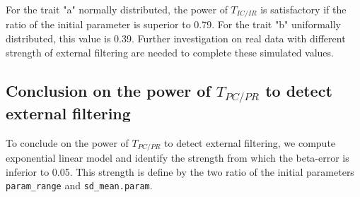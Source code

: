 \documentclass[12pt]{article}\usepackage[]{graphicx}\usepackage[]{color}
\begin{document}
For the trait "a" normally distributed, the power of $T_{IC/IR}$ is satisfactory if the ratio of the initial parameter is superior to
 0.79. For the trait "b" uniformally distributed, this value is 0.39. 
 Further investigation on real data with different strength of external filtering are needed to complete these simulated values.

 




  \subsection {Conclusion on the power of $T_{PC/PR}$ to detect external filtering}

To conclude on the power of $T_{PC/PR}$ to detect external filtering, we compute exponential linear model and identify the strength from which the beta-error is inferior to 0.05. This strength is define by the two ratio of the initial parameters \texttt{param\_range} and \texttt{sd\_mean.param}. 
\end{document}
